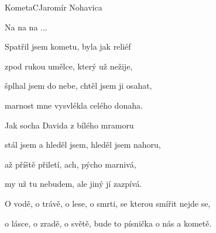 \begin{song}{Kometa}{C}{Jaromír Nohavica}
\begin{SBVerse}
\end{SBVerse}

\begin{SBChorus}

Na na na ...

\end{SBChorus}

\begin{SBVerse}

Spatřil jsem kometu, byla jak reliéf

zpod rukou umělce, který už nežije,

šplhal jsem do nebe, chtěl jsem ji osahat,

marnost mne vysvlékla celého donaha.

\end{SBVerse}

\begin{SBVerse}

Jak socha Davida z bílého mramoru

stál jsem a hleděl jsem, hleděl jsem nahoru,

až příště přiletí, ach, pýcho marnivá,

my už tu nebudem, ale jiný jí zazpívá.

\end{SBVerse}

\begin{SBChorus}

O vodě, o trávě, o lese, o smrti, se kterou smířit nejde se,

o lásce, o zradě, o světě, bude to písnička o nás a kometě.

\end{SBChorus}

\end{song}

\pagebreak